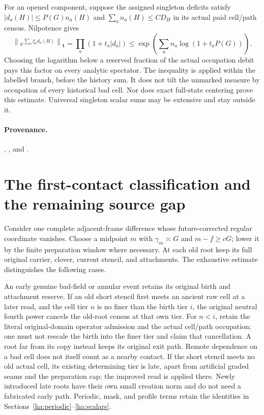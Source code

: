 For an opened component, suppose the assigned singleton deficits satisfy
$|d_a(H)|\leq P(G)n_a(H)$ and $\sum_an_a(H)\leq CD_H$ in its actual
paid cell/path census.  Nilpotence gives
\begin{equation}
 \left\|e^{\sum_a\xi_ad_a(H)}\right\|_{\mathbf t}
 =\prod_a(1+t_a|d_a|)
 \leq \exp\!\left(\sum_an_a\log(1+t_aP(G))\right).
 \label{ha:deficit-product}
\end{equation}
Choosing the logarithm below a reserved fraction of the actual occupation
debit pays this factor on every analytic spectator.  The inequality is
applied within the labelled branch, before the history sum.  It does not
tilt the unmarked measure by occupation of every historical bad cell.
Nor does exact full-state centering prove this estimate.  Universal
singleton scalar sums may be extensive and stay outside it.

\paragraph{Provenance.}
,
,
and .

\section{The first-contact classification and the remaining source gap}
\label{ha:first-contact}

Consider one complete adjacent-frame difference whose future-corrected
regular coordinate vanishes.  Choose a midpoint $m$ with
$\gamma_m\asymp G$ and $m-f\geq cG$; lower it by the finite preparation
window where necessary.  At each old root keep its full original
carrier, clover, current stencil, and attachments.  The exhaustive
estimate distinguishes the following cases.

An early genuine bad-field or annular event retains its original birth
and attachment reserve. If an old short stencil first meets an ancient
raw cell at a later read, and the cell tier $n$ is no finer than the
birth tier $i$, the original neutral fourth power cancels the old-root
census at that own tier. For $n<i$, retain the literal original-domain
operator admission and the actual cell/path occupation; one must not
rescale the birth into the finer tier and claim that cancellation.
A root far from its copy instead keeps
its original exit path.  Remote dependence on a bad cell does not itself
count as a nearby contact.  If the short stencil meets no old actual cell,
its existing determining tier is late, apart from artificial graded seams
and the preparation cap; the improved read is applied there.  Newly
introduced late roots have their own small creation norm and do not need
a fabricated early path.  Periodic, mask, and profile terms retain the
identities in Sections~\ref{ha:periodic}--\ref{ha:scalars}.

